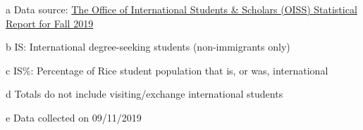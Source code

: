 \documentclass[10pt]{extarticle}
\theoremstyle{theorem}
\theoremstyle{lemma}
\theoremstyle{proposition}
\theoremstyle{corollary}
\theoremstyle{assumption}
\theoremstyle{model}
\theoremstyle{property}
\theoremstyle{example}
\theoremstyle{algorithm}
\theoremstyle{definition}
\theoremstyle{axiom}
\theoremstyle{remark}
\begin{document}
\begin{table}[H]
\begin{center}
\begin{threeparttable}
    \begin{tablenotes}
      \footnotesize
      \item [a] Data source: \href{https://oiss.rice.edu/sites/g/files/bxs1291/f/StatReport2019-Public-Version.pdf}{The Office of International Students \& Scholars (OISS) Statistical Report for Fall 2019}
      \item [b] IS: International degree-seeking students (non-immigrants only)
      \item [c] IS\%: Percentage of Rice student population that is, or was, international
      \item [d] Totals do not include visiting/exchange international students
      \item [e] Data collected on 09/11/2019 
    \end{tablenotes}
  \end{threeparttable}
\end{center}
\end{table}
\end{document}
